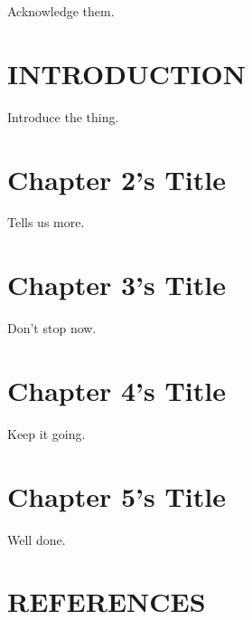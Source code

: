 \documentclass[]{article}
\begin{document}
Acknowledge them.

\newpage

 \fancyhead[R]{\thepage} \fancyfoot[C]{}
\tableofcontents

\newpage

 \fancyhead[R]{\thepage} \fancyfoot[C]{}
\listoftables

\newpage

 \fancyhead[R]{\thepage} \fancyfoot[C]{}
\listoffigures

\newpage


\newpage

 \fancyhead[R]{\thepage} \fancyfoot[C]{}

\chapter{INTRODUCTION}

Introduce the thing.

\FloatBarrier

\newpage

 \fancyhead[R]{\thepage} \fancyfoot[C]{}

\chapter{Chapter 2's Title}

Tells us more.

\FloatBarrier

\newpage

 \fancyhead[R]{\thepage} \fancyfoot[C]{}

\chapter{Chapter 3's Title}

Don't stop now.

\FloatBarrier
\newpage
{} \fancyhead[R]{\thepage} \fancyfoot[C]{}

\chapter{Chapter 4's Title}

Keep it going.

\FloatBarrier
\newpage
{} \fancyhead[R]{\thepage} \fancyfoot[C]{}

\chapter{Chapter 5's Title}

Well done.

\FloatBarrier

\newpage

 \fancyhead[R]{\thepage} \fancyfoot[C]{}

\chapter*{REFERENCES}

\setlength{\parindent}{-0.5in} \setlength{\leftskip}{0.4in}
\setlength{\parskip}{6pt} \noindent
\end{document}

